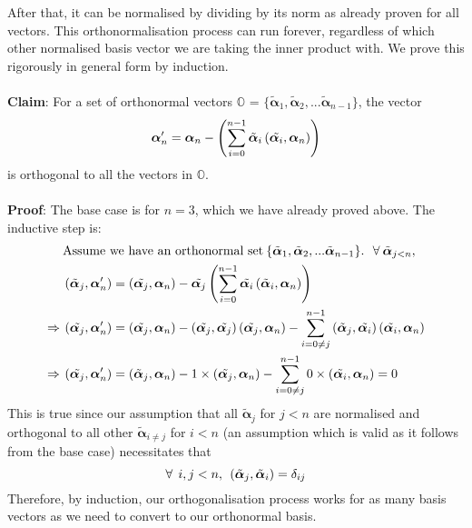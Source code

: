 After that, it can be normalised by dividing by its norm as already proven for all vectors. This orthonormalisation process can run forever, regardless of which other normalised basis vector we are taking the inner product with.  We prove this rigorously in general form by induction.
\\\\
\textbf{Claim}: For a set of orthonormal vectors $\mathbb{O}$ = $\{\tilde{\bm{\alpha}}_{1},\tilde{\bm{\alpha}}_{2},...\tilde{\bm{\alpha}}_{n-1}\}$, the vector
$$
\bm{\alpha}'_{n}= \bm{\alpha}_{n}-\left(\sum_{i=0}^{n-1}\tilde{\bm{\alpha}}_{i}\left(\tilde{\bm{\alpha}_{i}},\bm{\alpha}_{n}\right)\right)
$$
is orthogonal to all the vectors in $\mathbb{O}$.
\\\\
\textbf{Proof}:
The base case is for $n=3$, which we have already proved above. The inductive step is:
$$
\begin{aligned}
&\text{Assume we have an orthonormal set}\: 
\{\tilde{\bm{\alpha}}_{1},\tilde{\bm{\alpha}}_{2},...\tilde{\bm{\alpha}}_{n-1}\}. \:\:\: \forall\:\tilde{{\bm{\alpha}}}_{j < n}, \\
&\left(\tilde{\bm{\alpha}}_{j},\bm{\alpha}'_{n}\right)=\left(\tilde{\bm{\alpha}_{j}},\bm{\alpha}_{n}\right)-\tilde{\bm{\alpha}_{j}}\left(\sum_{i=0}^{n-1}\tilde{\bm{\alpha}_{i}}\left(\tilde{\bm{\alpha}}_{i},\bm{\alpha}_{n}\right)\right)\\
\Rightarrow\:&\left(\tilde{\bm{\alpha}_{j}},\bm{\alpha}'_{n}\right)=\left(\tilde{\bm{\alpha}_{j}},\bm{\alpha}_{n}\right)-\left(\tilde{\bm{\alpha}_{j}},\tilde{\bm{\alpha}_{j}}\right)\left(\tilde{\bm{\alpha}_{j}},\bm{\alpha}_{n}\right)-\sum_{i=0\neq j}^{n-1}\left(\tilde{\bm{\alpha}}_{j},\tilde{\bm{\alpha}_{i}}\right)\left(\tilde{\bm{\alpha}_{i}},\bm{\alpha}_{n}\right)\\
\Rightarrow\:&\left(\tilde{\bm{\alpha}_{j}},\bm{\alpha}'_{n}\right)=\left(\tilde{\bm{\alpha}}_{j},\bm{\alpha}_{n}\right)-1\times\left(\tilde{\bm{\alpha}_{j}},\bm{\alpha}_{n}\right)-\sum_{i=0\neq j}^{n-1}0\times\left(\tilde{\bm{\alpha}_{i}},\bm{\alpha}_{n}\right)=0
\end{aligned}
$$
This is true since our assumption that all $\tilde{\bm{\alpha}}_{j}$ for $j<n$ are normalised and orthogonal to all other $\tilde{\bm{\alpha}}_{i\neq j}$ for $i<n$ (an assumption which is valid as it follows from the base case) necessitates that 
$$
\forall\:\: i,j < n, \:\: \left(\tilde{\bm{\alpha}}_{j},\tilde{\bm{\alpha}}_{i}\right)= \delta_{ij}
$$
Therefore, by induction, our orthogonalisation process works for as many basis vectors as we need to convert to our orthonormal basis.
\\\\

